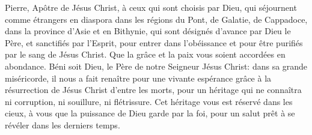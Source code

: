 Pierre, Apôtre de Jésus Christ, à ceux qui sont choisis par Dieu,
	qui séjournent comme étrangers en diaspora dans les régions du Pont,
	de Galatie, de Cappadoce, dans la province d’Asie et en Bithynie,
	qui sont désignés d’avance par Dieu le Père, et sanctifiés par l’Esprit,
	pour entrer dans l’obéissance et pour être purifiés par le sang de Jésus Christ.
Que la grâce et la paix vous soient accordées en abondance.
Béni soit Dieu, le Père de notre Seigneur Jésus Christ:
	dans sa grande miséricorde, il nous a fait renaître pour une vivante espérance
	grâce à la résurrection de Jésus Christ d’entre les morts,
	pour un héritage qui ne connaîtra ni corruption, ni souillure, ni flétrissure.
Cet héritage vous est réservé dans les cieux,
	à vous que la puissance de Dieu garde par la foi,
	pour un salut prêt à se révéler dans les derniers temps.
